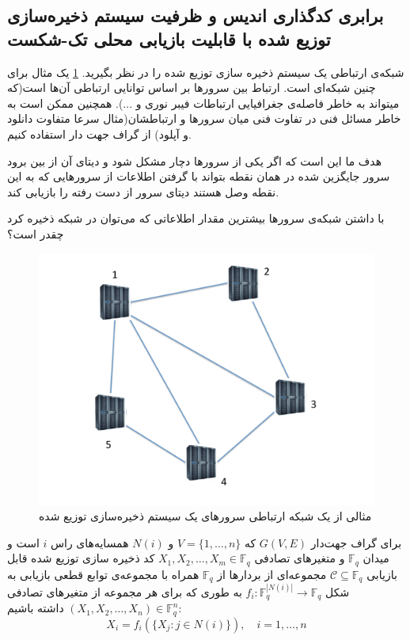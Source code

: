  \subsection{
 برابری کدگذاری اندیس و ظرفیت سیستم ذخیره‌سازی توزیع شده با قابلیت بازیابی محلی تک-شکست
 }
 شبکه‌ی ارتباطی یک سیستم ذخیره سازی توزیع شده را در نظر بگیرید.
 \ref{fig:storage-graph}
 یک مثال برای چنین شبکه‌ای است. ارتباط بین سرورها بر اساس توانایی ارتباطی آن‌ها است(که میتواند به خاطر فاصله‌ی جغرافیایی ارتباطات فیبر نوری و ...). همچنین ممکن است به خاطر مسائل فنی در تفاوت فنی میان سرورها و ارتباطشان(مثال سرعا متفاوت دانلود و آپلود) از گراف جهت دار استفاده کنیم.
 
 هدف ما این است که اگر یکی از سرورها دچار مشکل شود و دیتای آن از بین برود سرور جایگزین شده در همان نقطه بتواند با گرفتن اطلاعات از سرورهایی که به این نقطه وصل هستند دیتای سرور از دست رفته را بازیابی کند.
 
 با داشتن شبکه‌ی سرورها بیشترین مقدار اطلاعاتی که می‌توان در شبکه ذخیره کرد چقدر است؟
\begin{figure}[H]
	\centering
	\includegraphics[width=0.5\linewidth]{figs/chapter6/storage-graph}
	\caption{
		مثالی از یک شبکه ارتباطی سرورهای یک سیستم ذخیره‌سازی توزیع شده
		\cite{arya}
		}
	\label{fig:storage-graph}
\end{figure}

\begin{definition}
	برای گراف جهت‌دار
	$G(V, E)$
	که
	$V = \{1, \ldots, n\}$
	و
	$N(i)$
	همسایه‌های راس
	$i$
	است و میدان
	$\mathbb{F}_{q}$
	و متغیرهای تصادفی
	$X_1, X_2, \ldots, X_m \in \mathbb{F}_{q}$
		کد ذخیره سازی توزیع شده قابل بازیابی 
		$\mathcal{C} \subseteq \mathbb{F}_{q}$
		مجموعه‌ای از بردار‌ها از
		$\mathbb{F}_{q}$
		همراه با مجموعه‌ی توابع قطعی بازیابی به شکل
		$f_i: \mathbb{F}_q^{|N(i)|} \to \mathbb{F}_q$
		به طوری که برای هر مجموعه از متغیرهای تصادفی 
		$(X_1, X_2,\dots,X_n) \in \mathbb{F}_q^n$
		داشته باشیم:
		$$X_i = f_i(\{X_j: j \in N(i)\}), \quad i = 1,\dots,n$$
\end{definition}

